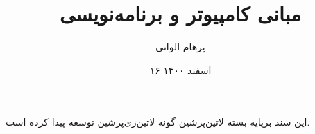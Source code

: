 \documentclass[]{article}
\title{مبانی کامپیوتر و برنامه‌نویسی}
\author{پرهام الوانی}
\date{۱۶ اسفند ۱۴۰۰}
\begin{document}
  \maketitle
  \tableofcontents
  \pagebreak

  
  
  

  \vspace*{\fill}
  \begin{center}
این سند برپایه بسته ‌لاتین{‌پرشین} گونه ‌لاتین{‌زی‌پرشین} توسعه پیدا کرده است.
  \end{center}
\end{document}
